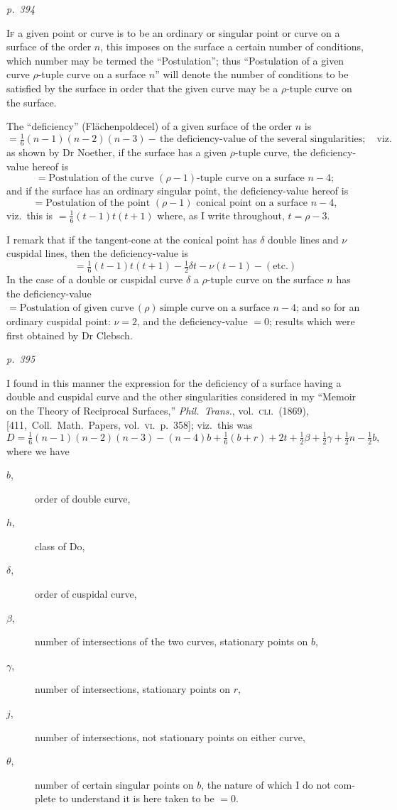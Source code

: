 \documentclass[11pt,a4paper]{book}
\begin{document}
\textit{p.~394}

\noindent
\textsc{If} a given point or curve is to be an ordinary or singular point or curve on a
surface of the order $n$, this imposes on the surface a certain number of conditions,
which number may be termed the ``Postulation''; thus ``Postulation of a given curve
$\rho$-tuple curve on a surface $n$'' will denote the number of conditions to be satisfied
by the surface in order that the given curve may be a $\rho$-tuple curve on the surface.

The ``deficiency'' (Fl\"achenpoldecel) of a given surface of the order $n$ is
\[
= \tfrac{1}{6}(n - 1)(n - 2)(n - 3) -\,\text{the deficiency-value of the several singularities}; \quad \text{viz.}
\]
as shown by Dr Noether, if the surface has a given $\rho$-tuple curve, the deficiency-value hereof is
\[
=\text{Postulation of the curve } (\rho - 1)\text{-tuple curve on a surface } n - 4;
\]
and if the surface has an ordinary singular point, the deficiency-value hereof is
\[
=\text{Postulation of the point } (\rho - 1)\text{ conical point on a surface } n - 4,
\]
viz.\ this is $= \tfrac{1}{6}(t - 1)t(t + 1)$ where, as I write throughout, $t = \rho - 3$.

I remark that if the tangent-cone at the conical point has $\delta$ double lines and
$\nu$ cuspidal lines, then the deficiency-value is
\[
= \tfrac{1}{6}(t - 1) t (t + 1) - \tfrac{1}{2}\delta t - \nu(t - 1) - (\text{etc.})
\]
In the case of a double or cuspidal curve $\delta$ a $\rho$-tuple curve on the surface $n$ has the deficiency-value
$= \text{Postulation of given curve}\,(\rho)\,\text{simple curve on a surface } n - 4$;
and so for an ordinary cuspidal point: $\nu = 2$, and the deficiency-value $= 0$; results
which were first obtained by Dr Clebsch.

\clearpage

\bigskip
\textit{p.~395}
\smallskip

\noindent
I found in this manner the expression for the deficiency of a surface having
a double and cuspidal curve and the other singularities considered in my ``Memoir on
the Theory of Reciprocal Surfaces,'' \textit{Phil.\ Trans.}, vol.\ \textsc{cli.\ (1869)}, [411,\ Coll.\ Math.\
Papers, vol.\ \textsc{vi}.\ p.\ 358]; viz.\ this was
\[
D = \tfrac{1}{6}(n - 1)(n - 2)(n - 3) - (n - 4)b + \tfrac{1}{6}(b + r) + 2t + \tfrac{1}{2}\beta + \tfrac{1}{2}\gamma + \tfrac{1}{2}n - \tfrac{1}{2}b,
\]
where we have
\begin{description}
\item[$b$,] order of double curve,
\item[$h$,] class of Do,
\item[$\delta$,] order of cuspidal curve,
\item[$\beta$,] number of intersections of the two curves, stationary points on $b$,
\item[$\gamma$,] number of intersections, stationary points on $r$,
\item[$j$,] number of intersections, not stationary points on either curve,
\item[$\theta$,] number of certain singular points on $b$, the nature of which I do not com-
plete to understand it is here taken to be $= 0$.
\end{description}
\end{document}
